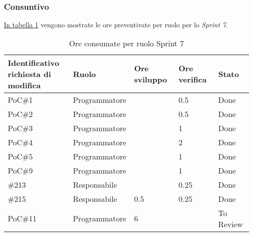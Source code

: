 \subsubsection{Consuntivo}
\hyperref[tab:sprint7_ore_consumate]{In tabella \ref{tab:sprint7_ore_consumate}} vengono mostrate le ore preventivate per ruolo per lo \textit{Sprint 7}.

\begin{table}[H]
    \centering
    \begin{tabular}{| l | l | l | l | l |}
        \hline
            \makecell{\textbf{Identificativo} \\ \textbf{richiesta di modifica}} &
            \textbf{Ruolo} &
            \textbf{Ore sviluppo} &
            \textbf{Ore verifica} &
            \textbf{Stato}\\
        \hline
        PoC\#1 & Programmatore &  & 0.5 & Done\\
        \hline
        PoC\#2 & Programmatore &  & 0.5 & Done\\
        \hline
        PoC\#3 & Programmatore &  & 1 & Done\\
        \hline
        PoC\#4 & Programmatore &  & 2 & Done\\
        \hline
        PoC\#5 & Programmatore &  & 1 & Done\\
        \hline
        PoC\#9 & Programmatore &  & 1 & Done\\
        \hline
        \#213 & Responsabile &  & 0.25 & Done\\
        \hline
        \#215 & Responsabile & 0.5 & 0.25 & Done\\
        \hline
        PoC\#11 & Programmatore & 6 & & To Review\\
        \hline
    \end{tabular}
    \caption{Ore consumate per ruolo Sprint 7}
    \label{tab:sprint7_ore_consumate} 
\end{table}